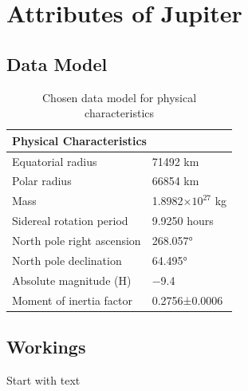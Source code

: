 \section{Attributes of Jupiter}
\subsection{Data Model}


\begin{table}
\begin{tabular}{ | l | l |}
\hline
\multicolumn{2}{|l|}{Physical Characteristics}  \\
\hline
Equatorial radius&71492 km  \\
Polar radius&66854 km  \\
Mass&1.8982×$10^27$ kg  \\
Sidereal rotation period&9.9250 hours  \\
North pole right ascension&268.057° \\
North pole declination&64.495° \\
Absolute magnitude (H)&−9.4 \\
Moment of inertia factor&0.2756±0.0006  \\
\hline
\end{tabular}

\caption{Chosen data model for physical characteristics}
\end{table}

\newpage
\subsection{Workings}
Start with text\\

